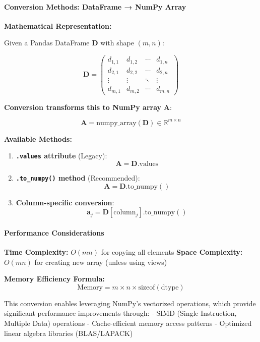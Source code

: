 \documentclass[11pt]{article}
\begin{document}
\paragraph{Conversion Methods: DataFrame → NumPy
Array}\label{conversion-methods-dataframe-numpy-array}

\textbf{Mathematical Representation:}

Given a Pandas DataFrame \(\mathbf{D}\) with shape \((m, n)\):

\[\mathbf{D} = \begin{pmatrix} 
d_{1,1} & d_{1,2} & \cdots & d_{1,n} \\
d_{2,1} & d_{2,2} & \cdots & d_{2,n} \\
\vdots & \vdots & \ddots & \vdots \\
d_{m,1} & d_{m,2} & \cdots & d_{m,n}
\end{pmatrix}\]

\textbf{Conversion transforms this to NumPy array} \(\mathbf{A}\):

\[\mathbf{A} = \text{numpy\_array}(\mathbf{D}) \in \mathbb{R}^{m \times n}\]

\textbf{Available Methods:}

\begin{enumerate}
\def\labelenumi{\arabic{enumi}.}
\item
  \textbf{\texttt{.values} attribute} (Legacy):
  \[\mathbf{A} = \mathbf{D}.\text{values}\]
\item
  \textbf{\texttt{.to\_numpy()} method} (Recommended):
  \[\mathbf{A} = \mathbf{D}.\text{to\_numpy}()\]
\item
  \textbf{Column-specific conversion}:
  \[\mathbf{a}_j = \mathbf{D}[\text{column}_j].\text{to\_numpy}()\]
\end{enumerate}

\paragraph{Performance Considerations}\label{performance-considerations}

\textbf{Time Complexity:} \(O(mn)\) for copying all elements
\textbf{Space Complexity:} \(O(mn)\) for creating new array (unless
using views)

\textbf{Memory Efficiency Formula:}
\[\text{Memory} = m \times n \times \text{sizeof}(\text{dtype})\]

This conversion enables leveraging NumPy's vectorized operations, which
provide significant performance improvements through: - SIMD (Single
Instruction, Multiple Data) operations - Cache-efficient memory access
patterns - Optimized linear algebra libraries (BLAS/LAPACK)
\end{document}
